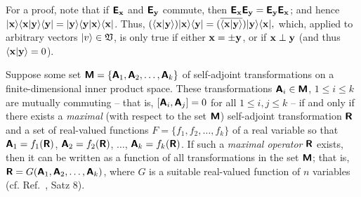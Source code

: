 {\color{OliveGreen}\bproof
For a proof,
note that if $\textsf{\textbf{E}}_{\bf x}$ and $\textsf{\textbf{E}}_{\bf y}$ commute, then
$\textsf{\textbf{E}}_{\bf x}\textsf{\textbf{E}}_{\bf y} =  \textsf{\textbf{E}}_{\bf y}    \textsf{\textbf{E}}_{\bf x}$; and
hence $
\vert {\bf x} \rangle \langle {\bf x} \vert {\bf y} \rangle \langle {\bf y} \vert
=
\vert {\bf y} \rangle \langle {\bf y} \vert {\bf x} \rangle \langle {\bf x} \vert $. Thus,
$
(
\langle {\bf x} \vert {\bf y} \rangle )\vert {\bf x} \rangle  \langle {\bf y}  \vert
=
(\overline{\langle {\bf x} \vert {\bf y} \rangle})
\vert {\bf y} \rangle  \langle {\bf x} \vert  ,
$
which, applied to arbitrary vectors $ \vert   v\rangle \in {\frak V}$, is only true if either ${\bf x} = \pm {\bf y}$,
or if ${\bf x} \perp {\bf y}$ (and thus $\langle {\bf x} \vert {\bf y} \rangle =0$).
\eproof
}



Suppose some set $\textsf{\textbf{M}}
=
\{
\textsf{\textbf{A}}_1,
\textsf{\textbf{A}}_2,
\ldots ,
\textsf{\textbf{A}}_k
\}
$
of  self-adjoint transformations on a finite-dimensional inner product space.
These  transformations  $\textsf{\textbf{A}}_i \in \textsf{\textbf{M}}$, $1\le i \le k$
are mutually commuting -- that is, $[\textsf{\textbf{A}}_i,\textsf{\textbf{A}}_j] =0$ for all $1\le i,j \le k$ -- if and only if there exists
a {\em maximal} (with respect to the set $\textsf{\textbf{M}}$) self-adjoint transformation  $\textsf{\textbf{R}}$ and
a set of real-valued functions
$F
=
\{
f_1,
f_2,
\ldots ,
f_k
\}
$ of a real variable so that
$
\textsf{\textbf{A}}_1=f_1 (\textsf{\textbf{R}})
$,
$
\textsf{\textbf{A}}_2=f_2 (\textsf{\textbf{R}})
$,
$\ldots $,
$\textsf{\textbf{A}}_k=f_k (\textsf{\textbf{R}})$.
If such a {\em maximal operator} $\textsf{\textbf{R}}$ exists, then
it can be written as a function of all transformations in the set $\textsf{\textbf{M}}$; that is,
$\textsf{\textbf{R}}=G(\textsf{\textbf{A}}_1,
\textsf{\textbf{A}}_2,
\ldots ,
\textsf{\textbf{A}}_k)$,
where $G$ is a suitable real-valued function of $n$ variables
(cf. Ref.~\cite{v-neumann-31}, Satz 8).


